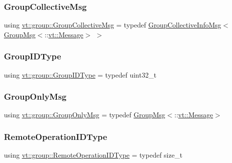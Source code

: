 \subsubsection{\texorpdfstring{Group\+Collective\+Msg}{GroupCollectiveMsg}}
{\footnotesize\ttfamily using \hyperlink{namespacevt_1_1group_a4c1183efe0185992fefb3ab38a55a8a7}{vt\+::group\+::\+Group\+Collective\+Msg} = typedef \hyperlink{structvt_1_1group_1_1_group_collective_info_msg}{Group\+Collective\+Info\+Msg}$<$\hyperlink{structvt_1_1group_1_1_group_msg}{Group\+Msg}$<$\+::\hyperlink{namespacevt_a3a3ddfef40b4c90915fa43cdd5f129ea}{vt\+::\+Message}$>$ $>$}

\mbox{\label{namespacevt_1_1group_a805a6643787ae841525c371fd0cefeb3}} 
\subsubsection{\texorpdfstring{Group\+I\+D\+Type}{GroupIDType}}
{\footnotesize\ttfamily using \hyperlink{namespacevt_1_1group_a805a6643787ae841525c371fd0cefeb3}{vt\+::group\+::\+Group\+I\+D\+Type} = typedef uint32\+\_\+t}

\mbox{\label{namespacevt_1_1group_a864fcf6bc821eacf8350bf4ad15e51b3}} 
\subsubsection{\texorpdfstring{Group\+Only\+Msg}{GroupOnlyMsg}}
{\footnotesize\ttfamily using \hyperlink{namespacevt_1_1group_a864fcf6bc821eacf8350bf4ad15e51b3}{vt\+::group\+::\+Group\+Only\+Msg} = typedef \hyperlink{structvt_1_1group_1_1_group_msg}{Group\+Msg}$<$\+::\hyperlink{namespacevt_a3a3ddfef40b4c90915fa43cdd5f129ea}{vt\+::\+Message}$>$}

\mbox{\label{namespacevt_1_1group_a73f2624ddeb535b39a08b6524f26b244}} 
\subsubsection{\texorpdfstring{Remote\+Operation\+I\+D\+Type}{RemoteOperationIDType}}
{\footnotesize\ttfamily using \hyperlink{namespacevt_1_1group_a73f2624ddeb535b39a08b6524f26b244}{vt\+::group\+::\+Remote\+Operation\+I\+D\+Type} = typedef size\+\_\+t}



